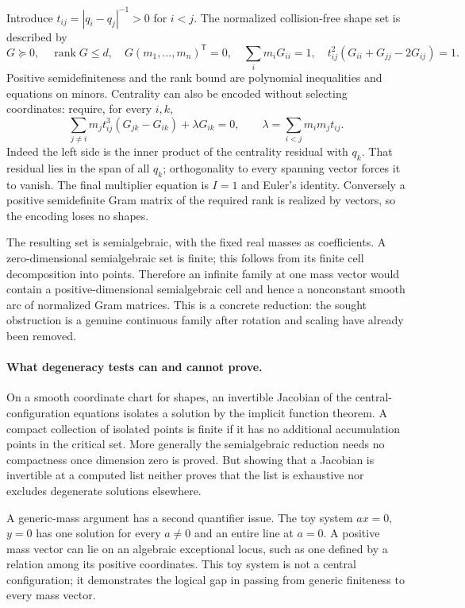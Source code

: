 \documentclass[11pt]{article}
\begin{document}
Introduce $t_{ij}=|q_i-q_j|^{-1}>0$ for $i<j$.
The normalized collision-free shape set is described by
\[
 G\succeq0,\quad \operatorname{rank}G\leq d,\quad
 G(m_1,\ldots,m_n)^{\mathsf T}=0,\quad
 \sum_i m_iG_{ii}=1,\quad
 t_{ij}^2(G_{ii}+G_{jj}-2G_{ij})=1.
\]
Positive semidefiniteness and the rank bound are polynomial
inequalities and equations on minors. Centrality can also be
encoded without selecting coordinates: require, for every $i,k$,
\begin{equation}\label{a410:gram}
 \sum_{j\ne i}m_jt_{ij}^3(G_{jk}-G_{ik})+\lambda G_{ik}=0,
 \qquad \lambda=\sum_{i<j}m_im_jt_{ij}.
\end{equation}
Indeed the left side is the inner product of the centrality
residual with $q_k$. That residual lies in the span of all $q_k$;
orthogonality to every spanning vector forces it to vanish.
The final multiplier equation is $I=1$ and Euler's identity.
Conversely a positive semidefinite Gram matrix of the required
rank is realized by vectors, so the encoding loses no shapes.

The resulting set is semialgebraic, with the fixed real masses as
coefficients. A zero-dimensional semialgebraic set is finite; this
follows from its finite cell decomposition into points. Therefore
an infinite family at one mass vector would contain a
positive-dimensional semialgebraic cell and hence a nonconstant
smooth arc of normalized Gram matrices. This is a concrete
reduction: the sought obstruction is a genuine continuous
family after rotation and scaling have already been removed.

\paragraph{What degeneracy tests can and cannot prove.}
On a smooth coordinate chart for shapes, an invertible Jacobian of
the central-configuration equations isolates a solution by the
implicit function theorem. A compact collection of isolated points
is finite if it has no additional accumulation points in the
critical set. More generally the semialgebraic reduction needs no
compactness once dimension zero is proved. But showing that a
Jacobian is invertible at a computed list neither proves that the
list is exhaustive nor excludes degenerate solutions elsewhere.

A generic-mass argument has a second quantifier issue. The toy
system $ax=0$, $y=0$ has one solution for every $a\ne0$ and an entire
line at $a=0$. A positive mass vector can lie on an algebraic
exceptional locus, such as one defined by a relation among its
positive coordinates. This toy system is not a central
configuration; it demonstrates the logical gap in passing from
generic finiteness to every mass vector.
\end{document}
